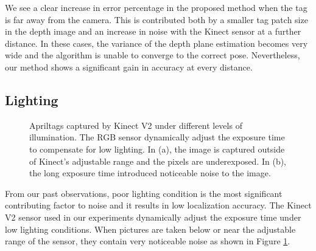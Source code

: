 We see a clear increase in error percentage in the proposed method when the tag is far away from the camera. This is contributed both by a smaller tag patch size in the depth image and an increase in noise with the Kinect sensor at a further distance. In these cases, the variance of the depth plane estimation becomes very wide and the algorithm is unable to converge to the correct pose. Nevertheless, our method shows a significant gain in accuracy at every distance.

\subsection{Lighting}
\begin{figure}
\centering
{}
\label{fig:illumination_tag}
\caption{Apriltags captured by Kinect V2 under different levels of illumination. The RGB sensor dynamically adjust the exposure time to compensate for low lighting. In (a), the image is captured outside of Kinect's adjustable range and the pixels are underexposed. In (b), the long exposure time introduced noticeable noise to the image. }
\end{figure}

From our past observations, poor lighting condition is the most significant contributing factor to noise and it results in low localization accuracy. The Kinect V2 sensor used in our experiments dynamically adjust the exposure time under low lighting conditions. When pictures are taken below or near the adjustable range of the sensor, they contain very noticeable noise as shown in Figure \ref{fig:illumination_tag}.

